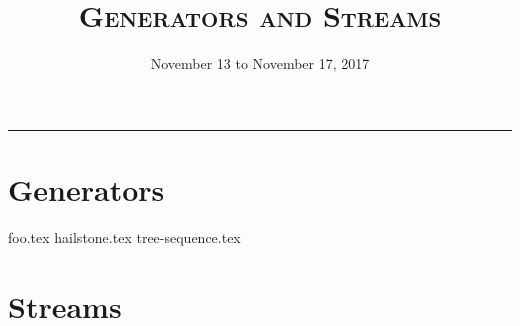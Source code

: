 \documentclass{exam}
\title{\textsc{Generators and Streams}}
\date{November 13 to November 17, 2017}
\begin{document}
\maketitle
\rule{\textwidth}{0.15em}
\fontsize{12}{15}\selectfont


\section{Generators}
\begin{questions}
    {foo.tex}
    \newpage
    {hailstone.tex}
    {tree-sequence.tex}
\end{questions}


\newpage
\section{Streams}
\end{document}
